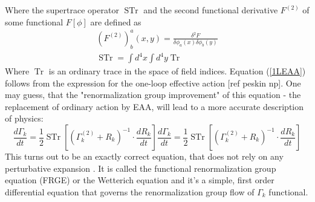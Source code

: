 \documentclass[11pt, a4paper]{article}
\begin{document}
Where the supertrace operator $ \operatorname{STr}$ and the second functional derivative $F^{(2)}$ of some functional $F[\phi]$ are defined as
\begin{gather}
    (F^{(2)})^a_b(x,y) = \frac{\delta^2 F}{\delta\phi_a(x)\delta\phi_b(y)}\\
    \operatorname{STr} = \int d^4 x \int d^4 y \operatorname{Tr}
\end{gather}
Where $\operatorname{Tr}$ is an ordinary trace in the space of field indices.
Equation (\ref{1LEAA}) follows from the expression for the one-loop effective action [ref peskin np]. 
One may guess, that the "renormalization group improvement" of this equation - the replacement of ordinary action by
 EAA, will lead to a more accurate description of physics:
\begin{equation}
    \frac{d \Gamma_k}{dt} = \frac{1}{2} \operatorname{STr} \left[ \left(\Gamma_k^{(2)} + R_k\right)^{-1} \cdot \frac{d R_k}{dt} \right]
    \frac{d \Gamma_k}{dt} = \frac{1}{2} \operatorname{STr} \left[ \left(\Gamma_k^{(2)} + R_k\right)^{-1} \cdot \frac{d R_k}{dt} \right]
    \label{FRGE}
\end{equation}
This turns out to be an exactly correct equation, that does not rely on any perturbative expansion \cite{wetteq}.
It is called the functional renormalization group equation (FRGE) or the Wetterich equation and
it's a simple, first order differential equation that governs the renormalization group flow of $\Gamma_k$ functional.
\end{document}
